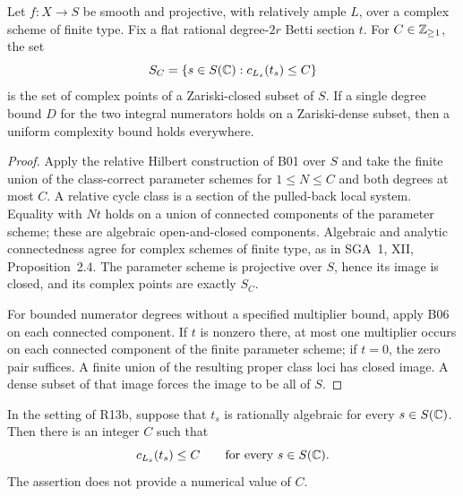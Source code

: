 \begin{proposition}
Let $f:X\to S$ be smooth and projective, with relatively ample $L$, over
a complex scheme of finite type. Fix a flat rational degree-$2r$ Betti
section $t$. For $C\in\mathbb Z_{\geq1}$, the set
\[
 S_C=\{s\in S(\mathbb C):c_{L_s}(t_s)\leq C\}
\]
is the set of complex points of a Zariski-closed subset of $S$.
If a single degree bound $D$ for the two integral numerators holds on a
Zariski-dense subset, then a uniform complexity bound holds everywhere.
\end{proposition}

\begin{proof}
Apply the relative Hilbert construction of B01 over $S$ and take the
finite union of the class-correct parameter schemes for $1\leq N\leq C$
and both degrees at most $C$. A relative cycle class is a section of the
pulled-back local system. Equality with $Nt$ holds on a union of connected
components of the parameter scheme; these are algebraic open-and-closed
components. Algebraic and analytic connectedness agree for complex
schemes of finite type, as in SGA~1, XII, Proposition~2.4. The parameter
scheme is projective over $S$, hence its image is closed, and its complex
points are exactly $S_C$.

For bounded numerator degrees without a specified multiplier bound,
apply B06 on each connected component. If $t$ is nonzero there, at most
one multiplier occurs on each connected component of the finite
parameter scheme; if $t=0$, the zero pair suffices. A finite union of
the resulting proper class loci has closed image. A dense subset of
that image forces the image to be all of $S$.
\end{proof}

\begin{theorem}
In the setting of R13b, suppose that $t_s$ is rationally algebraic for
every $s\in S(\mathbb C)$. Then there is an integer $C$ such that
\[
 c_{L_s}(t_s)\leq C\qquad\text{for every }s\in S(\mathbb C).
\]
The assertion does not provide a numerical value of $C$.
\end{theorem}


